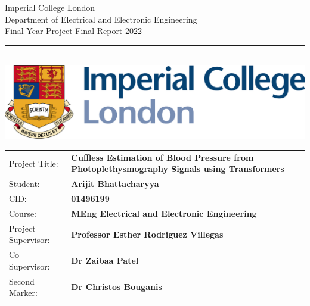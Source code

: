 \documentclass[12pt, a4paper]{article}
\begin{document}
\thispagestyle{empty}

\begin{titlepage}
\setlength{\parindent}{0pt}
\setlength{\parskip}{0pt}
{
    \Large
    \raggedright
    Imperial College London\\[17pt]
    Department of Electrical and Electronic Engineering\\[17pt]
    Final Year Project Final Report 2022\\[17pt]
}

\rule{\columnwidth}{3pt}
\vfill
    \begin{center}
    \quad\\[1.1cm]
    \includegraphics[width=15cm]{logo2.png}\\[1cm] %
    \end{center}\vfill
\setlength{\tabcolsep}{0pt}

\begin{tabular}{p{40mm}p{\dimexpr\columnwidth-40mm}}
    Project Title: & \textbf{Cuffless Estimation of Blood Pressure from Photoplethysmography Signals using Transformers} \\[12pt]
    Student: & \textbf{Arijit Bhattacharyya} \\[12pt]
    CID: & \textbf{01496199} \\[12pt]
    Course: & \textbf{MEng Electrical and Electronic Engineering} \\[12pt]
    Project Supervisor: & \textbf{Professor Esther Rodriguez Villegas} \\[12pt]
    Co Supervisor: & \textbf{Dr Zaibaa Patel} \\[12pt]
    Second Marker: & \textbf{Dr Christos Bouganis} \\[12pt]
\end{tabular}
\end{titlepage}


\newpage
{}

\newpage

\newpage
\tableofcontents
\newpage
{}
\newpage


\newpage

\newpage

\newpage

\newpage

\newpage

\newpage

\newpage

\newpage
\printbibliography[heading=bibintoc]
%

\newpage
{}

\end{document}
